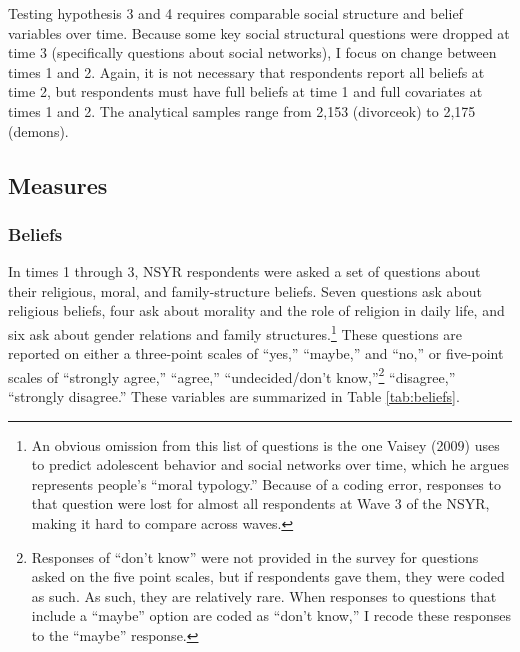 \documentclass[12pt,]{article}
\begin{document}
Testing hypothesis 3 and 4 requires comparable social structure and belief variables over time. Because some key social structural questions were dropped at time 3 (specifically questions about social networks), I focus on change between times 1 and 2. Again, it is not necessary that respondents report all beliefs at time 2, but respondents must have full beliefs at time 1 and full covariates at times 1 and 2. The analytical samples range from 2,153 (divorceok) to 2,175 (demons).

\hypertarget{measures}{%
\subsection{Measures}\label{measures}}

\hypertarget{beliefs}{%
\subsubsection{Beliefs}\label{beliefs}}

In times 1 through 3, NSYR respondents were asked a set of questions about their religious, moral, and family-structure beliefs. Seven questions ask about religious beliefs, four ask about morality and the role of religion in daily life, and six ask about gender relations and family structures.\footnote{An obvious omission from this list of questions is the one Vaisey (2009) uses to predict adolescent behavior and social networks over time, which he argues represents people's ``moral typology.'' Because of a coding error, responses to that question were lost for almost all respondents at Wave 3 of the NSYR, making it hard to compare across waves.} These questions are reported on either a three-point scales of ``yes,'' ``maybe,'' and ``no,'' or five-point scales of ``strongly agree,'' ``agree,'' ``undecided/don't know,''\footnote{Responses of ``don't know'' were not provided in the survey for questions asked on the five point scales, but if respondents gave them, they were coded as such. As such, they are relatively rare. When responses to questions that include a ``maybe'' option are coded as ``don't know,'' I recode these responses to the ``maybe'' response.} ``disagree,'' ``strongly disagree.'' These variables are summarized in Table \ref{tab:beliefs}.
\end{document}
